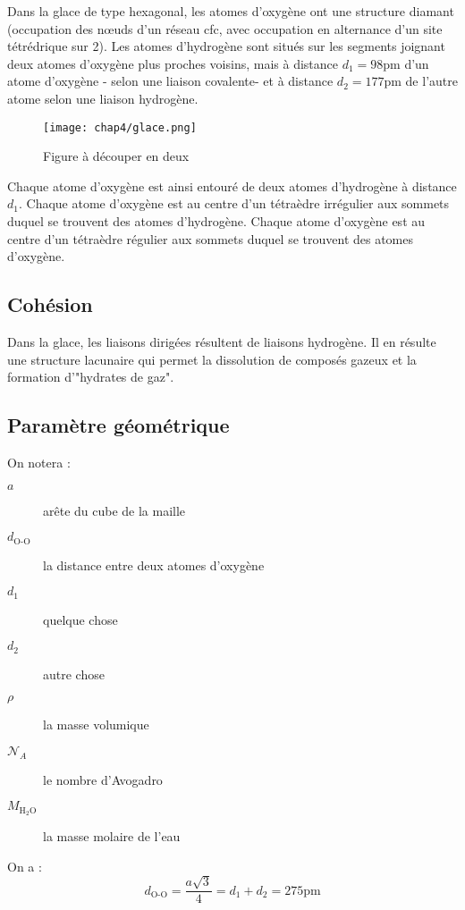 Dans la glace de type hexagonal, les atomes d’oxygène
ont une structure diamant (occupation des nœuds d’un
réseau cfc, avec occupation en alternance d’un
site tétrédrique sur 2).
Les atomes d’hydrogène sont situés sur les segments
joignant deux atomes d’oxygène plus proches voisins,
mais à distance $d_1=98$pm d’un atome d’oxygène \-- selon
une liaison covalente\-- et à distance $d_2= 177$pm
de l’autre atome selon une liaison hydrogène.
\begin{figure}
    \centering
    \texttt{[image: chap4/glace.png]}
    \caption{Figure à découper en deux}
    \label{fig:4_maille_site_flace}
\end{figure}
Chaque atome d'oxygène est ainsi entouré de deux
atomes d'hydrogène à distance $d_1$.
Chaque atome d’oxygène est au centre d’un tétraèdre
irrégulier aux sommets duquel se trouvent des atomes
d’hydrogène. Chaque atome d’oxygène est au centre
d’un tétraèdre régulier aux sommets duquel se trouvent
des atomes d’oxygène.

\subsection{Cohésion}
Dans la glace, les liaisons dirigées résultent de liaisons
hydrogène. Il en résulte une structure lacunaire qui permet
la dissolution de composés gazeux et la formation
d’"hydrates de gaz".

\subsection{Paramètre géométrique}
On notera :
\begin{description}
    \item[$a$] arête du cube de la maille
    \item[$d_\text{O-O}$] la distance entre deux atomes
        d'oxygène
    \item[$d_1$] quelque chose
    \item[$d_2$] autre chose
    \item[$\rho$] la masse volumique
    \item[$\mathcal{N}_A$] le nombre d'Avogadro
    \item[$M_{\text{H}_2\text{O}}$] la masse molaire de
        l'eau
\end{description}
On a :
\begin{equation}
    d_\text{O-O} = \frac{a\sqrt{3}}{4} = d_1 + d_2
    = 275\text{pm}
\end{equation}

